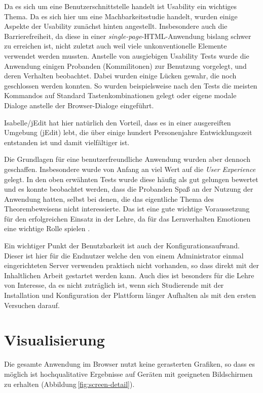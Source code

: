 Da es sich um eine Benutzerschnittstelle handelt ist Usability ein wichtiges Thema. Da es sich hier
um eine Machbarkeitsstudie handelt, wurden einige Aspekte der Usability zunächst hinten angestellt.
Insbesondere auch die Barrierefreiheit, da diese in einer \textit{single-page}-HTML-Anwendung
bislang schwer zu erreichen ist, nicht zuletzt auch weil viele unkonventionelle Elemente verwendet
werden mussten. Anstelle von ausgiebigen Usability Tests wurde die Anwendung einigen Probanden
(Kommilitonen) zur Benutzung vorgelegt, und deren Verhalten beobachtet. Dabei wurden einige Lücken
gewahr, die noch geschlossen werden konnten. So wurden beispielsweise nach den Tests die meisten
Kommandos auf Standard Tastenkombinationen gelegt oder eigene modale Dialoge anstelle der 
Browser-Dialoge eingeführt.

Isabelle/jEdit hat hier natürlich den Vorteil, dass es in einer ausgereiften Umgebung (jEdit) lebt,
die über einige hundert Personenjahre Entwicklungszeit entstanden ist und damit vielfältiger ist.

Die Grundlagen für eine benutzerfreundliche Anwendung wurden aber dennoch geschaffen. Insbesondere
wurde von Anfang an viel Wert auf die \textit{User Experience} gelegt. In den oben erwähnten Tests
wurde diese häufig als gut gelungen bewertet und es konnte beobachtet werden, dass die Probanden
Spaß an der Nutzung der Anwendung hatten, selbst bei denen, die das eigentliche Thema des
Theorembeweisens nicht interessierte. Das ist eine gute wichtige Voraussetzung für den erfolgreichen
Einsatz in der Lehre, da für das Lernverhalten Emotionen eine wichtige Rolle spielen
\cite{emotionaldesign}.

Ein wichtiger Punkt der Benutzbarkeit ist auch der Konfigurationsaufwand. Dieser ist hier für die
Endnutzer welche den von einem Administrator einmal eingerichteten Server verwenden praktisch nicht
vorhanden, so dass direkt mit der Inhaltlichen Arbeit gestartet werden kann. Auch dies ist besonders
für die Lehre von Interesse, da es nicht zuträglich ist, wenn sich Studierende mit der Installation
und Konfiguration der Plattform länger Aufhalten als mit den ersten Versuchen darauf.

\section{Visualisierung}

Die gesamte Anwendung im Browser nutzt keine gerasterten Grafiken, so dass es möglich ist
hochqualitative Ergebnisse auf Geräten mit geeigneten Bildschirmen zu erhalten 
(Abbildung\,\ref{fig:screen-detail}).

